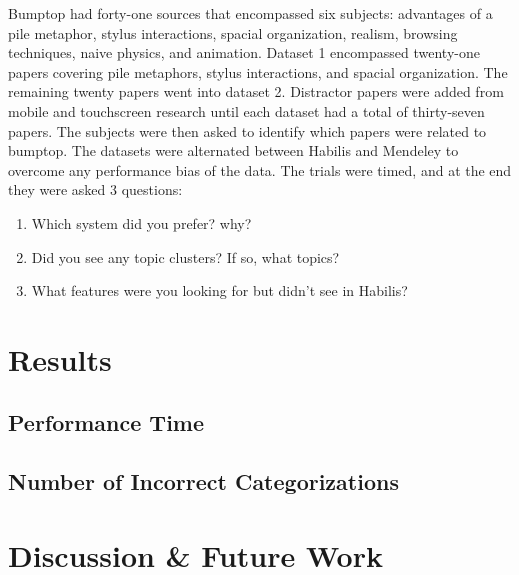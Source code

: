 \documentclass{article}
\begin{document}
	Bumptop had forty-one sources that encompassed six subjects: advantages of a pile metaphor, stylus interactions, spacial organization, realism, browsing techniques, naive physics, and animation.  Dataset 1 encompassed twenty-one papers covering pile metaphors, stylus interactions, and spacial organization.  The remaining twenty papers went into dataset 2.  Distractor papers were added from mobile and touchscreen research until each dataset had a total of thirty-seven papers.  The subjects were then asked to identify which papers were related to bumptop.  The datasets were alternated between Habilis and Mendeley to overcome any performance bias of the data.  The trials were timed, and at the end they were asked 3 questions:
	\begin{enumerate}
	\item Which system did you prefer? why?
	\item Did you see any topic clusters?  If so, what topics?
	\item What features were you looking for but didn't see in Habilis?
	\end{enumerate}
\section{Results}
\subsection*{Performance Time}
\subsection*{Number of Incorrect Categorizations}
\section{Discussion \& Future Work}



%
{}
\end{document}
